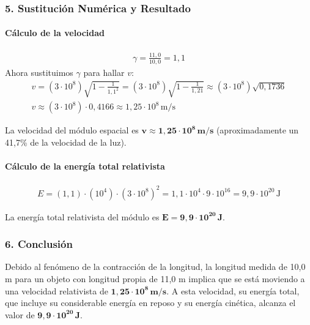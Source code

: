 \subsubsection*{5. Sustitución Numérica y Resultado}
\paragraph*{Cálculo de la velocidad}
\begin{gather}
    \gamma = \frac{11,0}{10,0} = 1,1
\end{gather}
Ahora sustituimos $\gamma$ para hallar $v$:
\begin{gather}
    v = (3 \cdot 10^8) \sqrt{1 - \frac{1}{1,1^2}} = (3 \cdot 10^8) \sqrt{1 - \frac{1}{1,21}} \approx (3 \cdot 10^8) \sqrt{0,1736} \nonumber \\
    v \approx (3 \cdot 10^8) \cdot 0,4166 \approx 1,25 \cdot 10^8 \, \text{m/s}
\end{gather}
\begin{cajaresultado}
    La velocidad del módulo espacial es $\boldsymbol{v \approx 1,25 \cdot 10^8 \, m/s}$ (aproximadamente un 41,7\% de la velocidad de la luz).
\end{cajaresultado}

\paragraph*{Cálculo de la energía total relativista}
\begin{gather}
    E = (1,1) \cdot (10^4) \cdot (3 \cdot 10^8)^2 = 1,1 \cdot 10^4 \cdot 9 \cdot 10^{16} = 9,9 \cdot 10^{20} \, \text{J}
\end{gather}
\begin{cajaresultado}
    La energía total relativista del módulo es $\boldsymbol{E = 9,9 \cdot 10^{20} \, J}$.
\end{cajaresultado}

\subsubsection*{6. Conclusión}
\begin{cajaconclusion}
    Debido al fenómeno de la contracción de la longitud, la longitud medida de 10,0 m para un objeto con longitud propia de 11,0 m implica que se está moviendo a una velocidad relativista de $\mathbf{1,25 \cdot 10^8 \, m/s}$. A esta velocidad, su energía total, que incluye su considerable energía en reposo y su energía cinética, alcanza el valor de $\mathbf{9,9 \cdot 10^{20} \, J}$.
\end{cajaconclusion}

\newpage